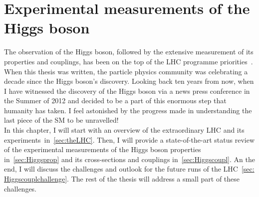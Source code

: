 \chapter{Experimental measurements of the Higgs boson }\label{chap:HiggsConstr}
The observation of the Higgs boson, followed by the extensive measurement of its properties and couplings, has been on the top of the LHC programme priorities~\cite{ellis2000physics}. When this thesis was written, the particle physics community was celebrating a decade since the Higgs boson's discovery. Looking back ten years from now, when I have witnessed the discovery of the Higgs boson via a news press conference in the Summer of 2012 and decided to be a part of this enormous step that humanity has taken.
I feel astonished by the progress made in understanding the last piece of the SM to be unravelled!  \\ In this chapter, I will start with an overview of the extraordinary LHC and its experiments~in~\autoref{sec:theLHC}. Then, I will provide a state-of-the-art status review of the experimental measurements of the Higgs boson properties in~\autoref{sec:Higgsprop} and its cross-sections and couplings in~\autoref{sec:Higgscoupl}. An the end, I will discuss the challenges and outlook for the future runs of the LHC~\autoref{sec: Higgscouplchallenge}. The rest of the thesis will address a small part of these challenges.

